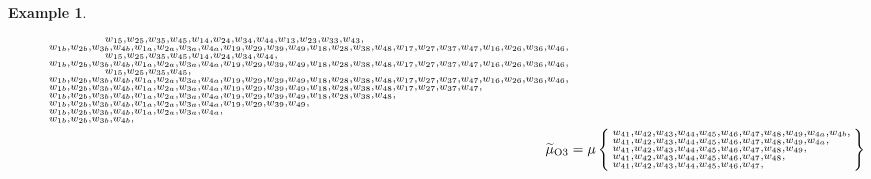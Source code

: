\documentclass{amsart}
\theoremstyle{plain}
\theoremstyle{definition}
\newtheorem{example}[theorem]{Example}
\theoremstyle{remark}
\newcommand{\muint}[1]{\widetilde{\mu}_{\text{#1}}}
\begin{document}
\begin{example}
\begin{figure}[h]
\begin{align*}
{\begin{subarray}{l}
        \qquad \qquad w_{15}, w_{25}, w_{35}, w_{45}, w_{14}, w_{24}, w_{34}, w_{44}, w_{13}, w_{23}, w_{33}, w_{43}, \\
w_{1b}, w_{2b}, w_{3b}, w_{4b}, w_{1a}, w_{2a}, w_{3a}, w_{4a}, w_{19}, w_{29}, w_{39}, w_{49}, w_{18}, w_{28}, w_{38}, w_{48}, w_{17}, w_{27}, w_{37}, w_{47}, w_{16}, w_{26}, w_{36}, w_{46}, \\
        \qquad \qquad w_{15}, w_{25}, w_{35}, w_{45}, w_{14}, w_{24}, w_{34}, w_{44}, \\
w_{1b}, w_{2b}, w_{3b}, w_{4b}, w_{1a}, w_{2a}, w_{3a}, w_{4a}, w_{19}, w_{29}, w_{39}, w_{49}, w_{18}, w_{28}, w_{38}, w_{48}, w_{17}, w_{27}, w_{37}, w_{47}, w_{16}, w_{26}, w_{36}, w_{46}, \\
        \qquad \qquad w_{15}, w_{25}, w_{35}, w_{45}, \\
w_{1b}, w_{2b}, w_{3b}, w_{4b}, w_{1a}, w_{2a}, w_{3a}, w_{4a}, w_{19}, w_{29}, w_{39}, w_{49}, w_{18}, w_{28}, w_{38}, w_{48}, w_{17}, w_{27}, w_{37}, w_{47}, w_{16}, w_{26}, w_{36}, w_{46}, \\
w_{1b}, w_{2b}, w_{3b}, w_{4b}, w_{1a}, w_{2a}, w_{3a}, w_{4a}, w_{19}, w_{29}, w_{39}, w_{49}, w_{18}, w_{28}, w_{38}, w_{48}, w_{17}, w_{27}, w_{37}, w_{47}, \\
w_{1b}, w_{2b}, w_{3b}, w_{4b}, w_{1a}, w_{2a}, w_{3a}, w_{4a}, w_{19}, w_{29}, w_{39}, w_{49}, w_{18}, w_{28}, w_{38}, w_{48}, \\
w_{1b}, w_{2b}, w_{3b}, w_{4b}, w_{1a}, w_{2a}, w_{3a}, w_{4a}, w_{19}, w_{29}, w_{39}, w_{49}, \\
w_{1b}, w_{2b}, w_{3b}, w_{4b}, w_{1a}, w_{2a}, w_{3a}, w_{4a}, \\
w_{1b}, w_{2b}, w_{3b}, w_{4b}, \\
          \end{subarray}
        } \\
        \muint{O3} &= \mu\Set{
          \begin{subarray}{l}
w_{41}, w_{42}, w_{43}, w_{44}, w_{45}, w_{46}, w_{47}, w_{48}, w_{49}, w_{4a}, w_{4b}, \\
w_{41}, w_{42}, w_{43}, w_{44}, w_{45}, w_{46}, w_{47}, w_{48}, w_{49}, w_{4a}, \\
w_{41}, w_{42}, w_{43}, w_{44}, w_{45}, w_{46}, w_{47}, w_{48}, w_{49}, \\
w_{41}, w_{42}, w_{43}, w_{44}, w_{45}, w_{46}, w_{47}, w_{48}, \\
w_{41}, w_{42}, w_{43}, w_{44}, w_{45}, w_{46}, w_{47}, \\

\end{subarray}}
\end{align*}
\end{figure}
\end{example}
\end{document}
